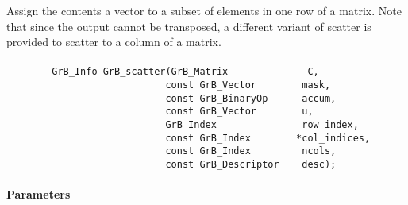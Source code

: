 Assign the contents a vector to a subset of elements in one row of a matrix. 
Note that since the output cannot be transposed, a different variant of
{\sf scatter} is provided to scatter to a column of a matrix.

\paragraph{\syntax}

\begin{verbatim}
        GrB_Info GrB_scatter(GrB_Matrix              C,
                            const GrB_Vector        mask,
                            const GrB_BinaryOp      accum,
                            const GrB_Vector        u,
                            GrB_Index               row_index,
                            const GrB_Index        *col_indices,
                            const GrB_Index         ncols,
                            const GrB_Descriptor    desc); 
\end{verbatim}

\paragraph{Parameters}

